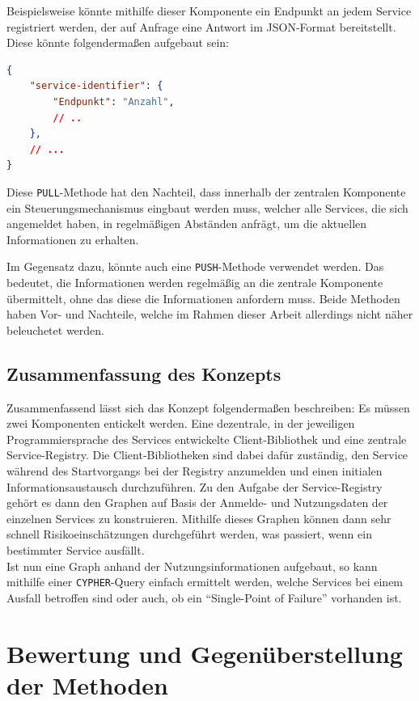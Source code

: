 Beispielsweise könnte mithilfe dieser Komponente ein Endpunkt an jedem Service registriert werden, der auf Anfrage eine Antwort im JSON-Format bereitstellt. Diese könnte folgendermaßen aufgebaut sein:

\begin{lstlisting}[language=json, caption={Antwort über Nutzung anderer Services}]
{
	"service-identifier": {
		"Endpunkt": "Anzahl",
		// ..
	},
	// ...
}
\end{lstlisting}

Diese \texttt{PULL}-Methode hat den Nachteil, dass innerhalb der zentralen Komponente ein Steuerungsmechanismus eingbaut werden muss, welcher alle Services, die sich angemeldet haben, in regelmäßigen Abständen anfrägt, um die aktuellen Informationen zu erhalten.

Im Gegensatz dazu, könnte auch eine \texttt{PUSH}-Methode verwendet werden. Das bedeutet, die Informationen werden regelmäßig an die zentrale Komponente übermittelt, ohne das diese die Informationen anfordern muss. Beide Methoden haben Vor- und Nachteile, welche im Rahmen dieser Arbeit allerdings nicht näher beleuchetet werden.

\subsection{Zusammenfassung des Konzepts}

Zusammenfassend lässt sich das Konzept folgendermaßen beschreiben: Es müssen zwei Komponenten entickelt werden. Eine dezentrale, in der jeweiligen Programmiersprache des Services entwickelte Client-Bibliothek und eine zentrale Service-Registry. Die Client-Bibliotheken sind dabei dafür zuständig, den Service während des Startvorgangs bei der Registry anzumelden und einen initialen Informationsaustausch durchzuführen. Zu den Aufgabe der Service-Registry gehört es dann den Graphen auf Basis der Anmelde- und Nutzungsdaten der einzelnen Services zu konstruieren. Mithilfe dieses Graphen können dann sehr schnell Risikoeinschätzungen durchgeführt werden, was passiert, wenn ein bestimmter Service ausfällt. \\
Ist nun eine Graph anhand der Nutzungsinformationen aufgebaut, so kann mithilfe einer \texttt{CYPHER}-Query einfach ermittelt werden, welche Services bei einem Ausfall betroffen sind oder auch, ob ein \enquote{Single-Point of Failure} vorhanden ist.

\section{Bewertung und Gegenüberstellung der Methoden}

